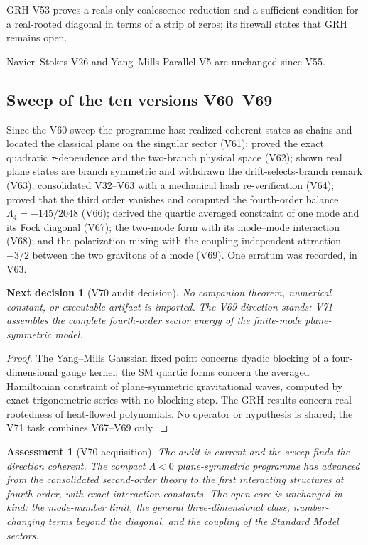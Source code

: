 \documentclass[11pt]{article}
\newtheorem{decision}[theorem]{Next decision}
\newtheorem{assessment}[theorem]{Assessment}
\theoremstyle{remark}
\begin{document}
GRH V53 proves a reals-only coalescence reduction and a sufficient
condition for a real-rooted diagonal in terms of a strip of zeros; its
firewall states that GRH remains open.

Navier--Stokes V26 and Yang--Mills Parallel V5 are unchanged since V55.

\subsection{Sweep of the ten versions V60--V69}

Since the V60 sweep the programme has: realized coherent states as
chains and located the classical plane on the singular sector (V61);
proved the exact quadratic \(\tau\)-dependence and the two-branch
physical space (V62); shown real plane states are branch symmetric and
withdrawn the drift-selects-branch remark (V63); consolidated V32--V63
with a mechanical hash re-verification (V64); proved that the third
order vanishes and computed the fourth-order balance
\(\Lambda_4=-145/2048\) (V66); derived the quartic averaged constraint
of one mode and its Fock diagonal (V67); the two-mode form with its
mode--mode interaction (V68); and the polarization mixing with the
coupling-independent attraction \(-3/2\) between the two gravitons of
a mode (V69).  One erratum was recorded, in V63.

\begin{decision}[V70 audit decision]
\label{dec:v19v70-audit}
No companion theorem, numerical constant, or executable artifact is
imported.  The V69 direction stands: V71 assembles the complete
fourth-order sector energy of the finite-mode plane-symmetric model.
\end{decision}

\begin{proof}
The Yang--Mills Gaussian fixed point concerns dyadic blocking of a
four-dimensional gauge kernel; the SM quartic forms concern the
averaged Hamiltonian constraint of plane-symmetric gravitational waves,
computed by exact trigonometric series with no blocking step.  The
GRH results concern real-rootedness of heat-flowed polynomials.  No
operator or hypothesis is shared; the V71 task combines V67--V69 only.
\end{proof}

\begin{assessment}[V70 acquisition]
\label{ass:v19v70}
The audit is current and the sweep finds the direction coherent.  The
compact \(\Lambda<0\) plane-symmetric programme has advanced from the
consolidated second-order theory to the first interacting structures
at fourth order, with exact interaction constants.  The open core is
unchanged in kind: the mode-number limit, the general
three-dimensional class, number-changing terms beyond the diagonal,
and the coupling of the Standard Model sectors.
\end{assessment}
\end{document}
